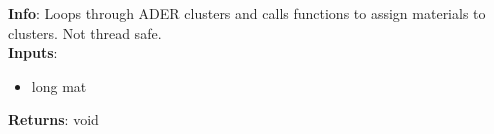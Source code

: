 \textbf{Info}: Loops through ADER clusters and calls functions to assign
materials to clusters. Not thread safe.\\

\noindent \textbf{Inputs}:
\begin{itemize}
\item{long mat}
\end{itemize}

\noindent \textbf{Returns}: void
